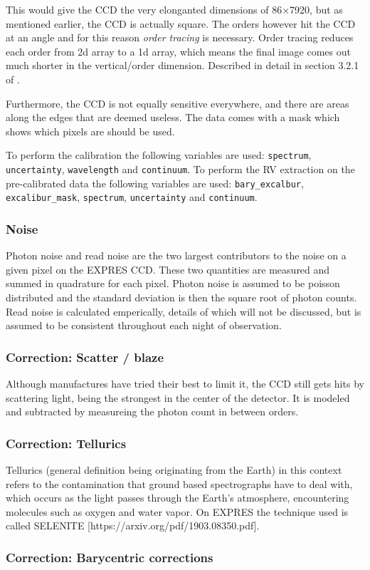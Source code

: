This would give the CCD the very elonganted dimensions of 86$\times$7920, but as mentioned earlier, the CCD is actually square. The orders however hit the CCD at an angle and for this reason \emph{order tracing} is necessary. Order tracing reduces each order from 2d array to a 1d array, which means the final image comes out much shorter in the vertical/order dimension. Described in detail in section 3.2.1 of \cite{first_RV_from_EXPRES}.

Furthermore, the CCD is not equally sensitive everywhere, and there are areas along the edges that are deemed useless. The data comes with a mask which shows which pixels are should be used. 

To perform the calibration the following variables are used: \verb|spectrum|, \verb|uncertainty|, \verb|wavelength| and \verb|continuum|. To perform the RV extraction on the pre-calibrated data the following variables are used: \verb|bary_excalbur|, 
\verb|excalibur_mask|, \verb|spectrum|, \verb|uncertainty| and \verb|continuum|.

\subsubsection{Noise}
Photon noise and read noise are the two largest contributors to the noise on a given pixel on the EXPRES CCD. These two quantities are measured and summed in quadrature for each pixel. Photon noise is assumed to be poisson distributed and the standard deviation is then the square root of photon counts. Read noise is calculated emperically, details of which will not be discussed, but is assumed to be consistent throughout each night of observation. 

\subsubsection{Correction: Scatter / blaze}
Although manufactures have tried their best to limit it, the CCD still gets hits by scattering light, being the strongest in the center of the detector. It is modeled and subtracted by measureing the photon count in between orders.

\subsubsection{Correction: Tellurics}
Tellurics (general definition being originating from the Earth) in this context refers to the contamination that ground based spectrographs have to deal with, which occurs as the light passes through the Earth's atmosphere, encountering molecules such as oxygen and water vapor. On EXPRES the technique used is called SELENITE [https://arxiv.org/pdf/1903.08350.pdf].

\subsubsection{Correction: Barycentric corrections}
\todo{}




